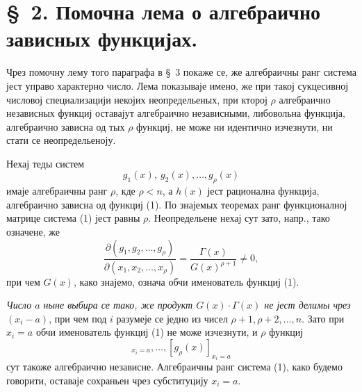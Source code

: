 ﻿\documentclass[11pt]{article}
\begin{document}
\section*{\S\ 2. Помочна лема о алгебраично зависных функцијах.}

Чрез помочну лему того параграфа в \S\ 3 покаже се, же алгебраичны ранг система јест управо характерно число. Лема показываје имено, же при такој сукцесивној числовој специализацији некојих неопредельеных, при кторој $\rho$ алгебраично независных функциј оставајут алгебраично независными, либовольна функција, алгебраично зависна од тых $\rho$ функциј, не може ни идентично изчезнути, ни стати се неопредельеноју.

Нехај теды систем
\begin{equation}
  g_1(x),\ g_2(x),\ldots,g_\rho(x)
\tag{1}
\end{equation}
имаје алгебраичны ранг $\rho$, кде $\rho<n$, а $h(x)$ јест рационална функција, алгебраично зависна од функциј (1). По знајемых теоремах ранг функционалној матрице система (1) јест равны $\rho$. Неопредельене нехај сут зато, напр., тако означене, же
\begin{equation}
 \frac{\partial(g_1,g_2,\ldots,g_\rho)}{\partial(x_1,x_2,\ldots,x_\rho)}
 =\frac{\Gamma(x)}{G(x)^{\rho+1}}\ne0,
\tag{2}
\end{equation}
при чем $G(x)$, како знајемо, означа обчи именователь функциј (1).

{\itshape Число $a$ ныне выбира се тако, же продукт $G(x)\cdot\Gamma(x)$ не јест делимы чрез $(x_i-a)$}, при чем под $i$ разумеје се једно из чисел $\rho+1,\rho+2,\ldots,n$. Зато при $x_i=a$ обчи именователь функциј (1) не може изчезнути, и $\rho$ функциј
\begin{equation}
  [g_1(x)]_{x_i=a},\ldots,[g_\rho(x)]_{x_i=a}
\tag{3}
\end{equation}
сут такоже алгебраично независне. Алгебраичны ранг система (1), како будемо говорити, оставаје сохраньен чрез субституцију $x_i=a$.
\end{document}
